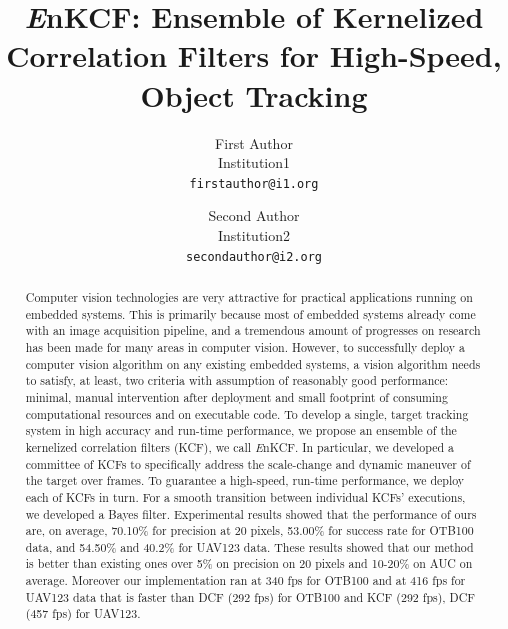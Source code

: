 \documentclass[10pt,twocolumn,letterpaper]{article}
\begin{document}
\title{{\it E}nKCF: Ensemble of Kernelized Correlation Filters for
  High-Speed, Object Tracking}

\author{First Author \\
Institution1\\
{\tt\small firstauthor@i1.org}
\and
Second Author \\
Institution2\\
{\tt\small secondauthor@i2.org}
}

\maketitle
\ifwacvfinal\thispagestyle{empty}\fi

\begin{abstract}
Computer vision technologies are very attractive for practical
applications running on embedded systems. This is primarily because
most of embedded systems already come with an image acquisition
pipeline, and a tremendous amount of progresses on research has been
made for many areas in computer vision. However, to successfully
deploy a computer vision algorithm on any existing embedded systems, a
vision algorithm needs to satisfy, at least, two criteria with
assumption of reasonably good performance: minimal, manual
intervention after deployment and small footprint of consuming
computational resources and on executable code. To develop a single,
target tracking system in high accuracy and run-time performance, we
propose an ensemble of the kernelized correlation filters (KCF), we
call {\it E}nKCF. In particular, we developed a committee of KCFs to
specifically address the scale-change and dynamic maneuver of the
target over frames. To guarantee a high-speed, run-time performance, we
deploy each of KCFs in turn. For a smooth transition between
individual KCFs' executions, we developed a Bayes filter. Experimental
results showed that the performance of ours are, on average, 70.10\%
for precision at 20 pixels, 53.00\% for success rate for OTB100 data,
and 54.50\% and 40.2\% for UAV123 data. These results showed that our
method is better than existing ones over 5\% on precision on 20 pixels
and 10-20\% on AUC on average. Moreover our implementation ran at 340
fps for OTB100 and at 416 fps for UAV123 data that is faster than DCF
(292 fps) for OTB100 and KCF (292 fps), DCF (457 fps) for UAV123.
\end{abstract}
\end{document}
